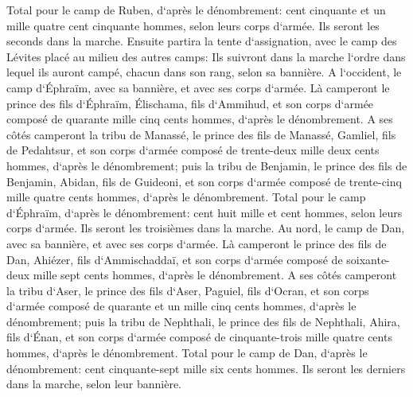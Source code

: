 \verse Total pour le camp de Ruben, d`après le dénombrement: cent cinquante et un mille quatre cent cinquante hommes, selon leurs corps d`armée. Ils seront les seconds dans la marche. 
\verse Ensuite partira la tente d`assignation, avec le camp des Lévites placé au milieu des autres camps: Ils suivront dans la marche l`ordre dans lequel ils auront campé, chacun dans son rang, selon sa bannière. 
\verse A l`occident, le camp d`Éphraïm, avec sa bannière, et avec ses corps d`armée. Là camperont le prince des fils d`Éphraïm, Élischama, fils d`Ammihud, 
\verse et son corps d`armée composé de quarante mille cinq cents hommes, d`après le dénombrement. 
\verse A ses côtés camperont la tribu de Manassé, le prince des fils de Manassé, Gamliel, fils de Pedahtsur, 
\verse et son corps d`armée composé de trente-deux mille deux cents hommes, d`après le dénombrement; 
\verse puis la tribu de Benjamin, le prince des fils de Benjamin, Abidan, fils de Guideoni, 
\verse et son corps d`armée composé de trente-cinq mille quatre cents hommes, d`après le dénombrement. 
\verse Total pour le camp d`Éphraïm, d`après le dénombrement: cent huit mille et cent hommes, selon leurs corps d`armée. Ils seront les troisièmes dans la marche. 
\verse Au nord, le camp de Dan, avec sa bannière, et avec ses corps d`armée. Là camperont le prince des fils de Dan, Ahiézer, fils d`Ammischaddaï, 
\verse et son corps d`armée composé de soixante-deux mille sept cents hommes, d`après le dénombrement. 
\verse A ses côtés camperont la tribu d`Aser, le prince des fils d`Aser, Paguiel, fils d`Ocran, 
\verse et son corps d`armée composé de quarante et un mille cinq cents hommes, d`après le dénombrement; 
\verse puis la tribu de Nephthali, le prince des fils de Nephthali, Ahira, fils d`Énan, 
\verse et son corps d`armée composé de cinquante-trois mille quatre cents hommes, d`après le dénombrement. 
\verse Total pour le camp de Dan, d`après le dénombrement: cent cinquante-sept mille six cents hommes. Ils seront les derniers dans la marche, selon leur bannière. 
